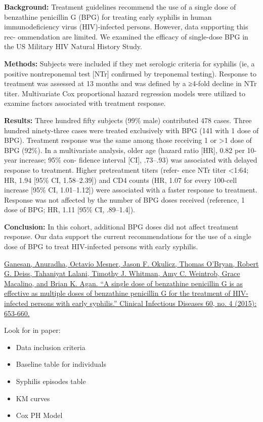 \documentclass[
]{article}
\providecommand{\tightlist}{%
  \setlength{\itemsep}{0pt}\setlength{\parskip}{0pt}}
\begin{document}
\textbf{Background:} Treatment guidelines recommend the use of a single
dose of benzathine penicillin G (BPG) for treating early syphilis in
human immunodeficiency virus (HIV)-infected persons. However, data
supporting this rec- ommendation are limited. We examined the efficacy
of single-dose BPG in the US Military HIV Natural History Study.

\textbf{Methods:} Subjects were included if they met serologic criteria
for syphilis (ie, a positive nontreponemal test {[}NTr{]} confirmed by
treponemal testing). Response to treatment was assessed at 13 months and
was defined by a ≥4-fold decline in NTr titer. Multivariate Cox
proportional hazard regression models were utilized to examine factors
associated with treatment response.

\textbf{Results:} Three hundred fifty subjects (99\% male) contributed
478 cases. Three hundred ninety-three cases were treated exclusively
with BPG (141 with 1 dose of BPG). Treatment response was the same among
those receiving 1 or \textgreater1 dose of BPG (92\%). In a multivariate
analysis, older age (hazard ratio {[}HR{]}, 0.82 per 10-year increase;
95\% con- fidence interval {[}CI{]}, .73--.93) was associated with
delayed response to treatment. Higher pretreatment titers (refer- ence
NTr titer \textless1:64; HR, 1.94 {[}95\% CI, 1.58--2.39{]}) and CD4
counts (HR, 1.07 for every 100-cell increase {[}95\% CI, 1.01--1.12{]})
were associated with a faster response to treatment. Response was not
affected by the number of BPG doses received (reference, 1 dose of BPG;
HR, 1.11 {[}95\% CI, .89--1.4{]}).

\textbf{Conclusion:} In this cohort, additional BPG doses did not affect
treatment response. Our data support the current recommendations for the
use of a single dose of BPG to treat HIV-infected persons with early
syphilis.

\href{https://academic.oup.com/cid/article/60/4/653/2895840}{Ganesan,
Anuradha, Octavio Mesner, Jason F. Okulicz, Thomas O'Bryan, Robert G.
Deiss, Tahaniyat Lalani, Timothy J. Whitman, Amy C. Weintrob, Grace
Macalino, and Brian K. Agan. ``A single dose of benzathine penicillin G
is as effective as multiple doses of benzathine penicillin G for the
treatment of HIV-infected persons with early syphilis.'' Clinical
Infectious Diseases 60, no. 4 (2015): 653-660.}

Look for in paper:

\begin{itemize}
\tightlist
\item
  Data inclusion criteria
\item
  Baseline table for individuals
\item
  Syphilis episodes table
\item
  KM curves
\item
  Cox PH Model
\end{itemize}
\end{document}
